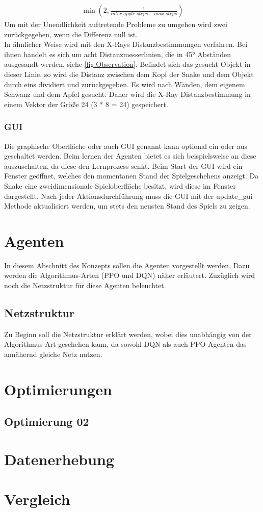 \begin{align}
	\min(2, \frac{1}{inter\_apple\_steps - max\_steps})
\end{align}
Um mit der Unendlichkeit auftretende Probleme zu umgehen wird zwei zurückgegeben, wenn die Differenz null ist.\\
In ähnlicher Weise wird mit den X-Rays Distanzbestimmungen verfahren. Bei ihnen handelt es sich um acht Distanzmesserlinien, die in 45° Abständen ausgesandt werden, siehe \ref{fig:Observation}. Befindet sich das gesucht Objekt in dieser Linie, so wird die Distanz zwischen dem Kopf der Snake und dem Objekt durch eins dividiert und zurückgegeben. Es wird nach Wänden, dem eigenem Schwanz und dem Apfel gesucht. Daher wird die X-Ray Distanzbestimmung in einem Vektor der Größe 24 (3 * 8 = 24) gespeichert.

\subsubsection{GUI}
Die graphische Oberfläche oder auch GUI genannt kann optional ein oder aus geschaltet werden. Beim lernen der Agenten bietet es sich beispielsweise an diese auszuschalten, da diese den Lernprozess senkt. Beim Start der GUI wird ein Fenster geöffnet, welches den momentanen Stand der Spielgeschehens anzeigt. Da Snake eine zweidimensionale Spieloberfläche besitzt, wird diese im Fenster dargestellt. Nach jeder Aktionsdurchführung muss die GUI mit der update\_gui Methode aktualisiert werden, um stets den neusten Stand des Spiels zu zeigen.

\section{Agenten} \label{sec:Konzept_Agenten}
In diesem Abschnitt des Konzepts sollen die Agenten vorgestellt werden. Dazu werden die Algorithmus-Arten (PPO und DQN) näher erläutert. Zuzüglich wird noch die Netzstruktur für diese Agenten beleuchtet.

\subsection{Netzstruktur}
Zu Beginn soll die Netzstruktur erklärt werden, wobei dies unabhängig von der Algorithmus-Art geschehen kann, da sowohl DQN als auch PPO Agenten das annähernd gleiche Netz nutzen.


\section{Optimierungen}

\subsection{Optimierung 02} \label{sec:Konzept_Optimierung02}

\section{Datenerhebung} \label{sec:Konzept_Datenerhebung}

\section{Vergleich} \label{sec:Konzept_Vergleich}